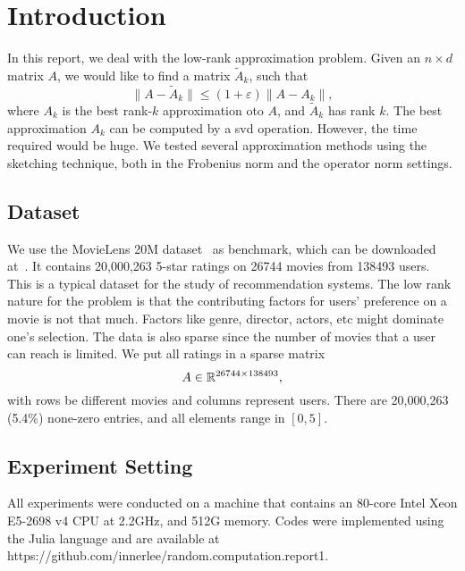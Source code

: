 \section{Introduction}
\label{sec:intro}

In this report, we deal with the low-rank approximation problem.
Given an $n\times d$ matrix $A$,
we would like to find a matrix $\tilde{A}_k$,
such that
\begin{equation}
    \| A - \tilde{A}_k \| \le (1+\varepsilon) \| A - A_k \|,
\end{equation}
where $A_k$ is the best rank-$k$ approximation oto $A$,
and $\tilde{A}_k$ has rank $k$.
The best approximation $A_k$ can be computed by a svd operation.
However, the time required would be huge.
We tested several approximation methods using the sketching technique,
both in the Frobenius norm and the operator norm settings.

\subsection{Dataset}

We use the MovieLens 20M dataset~\cite{lens} as benchmark,
which can be downloaded at~\cite{movielens}.
It contains 20,000,263 5-star ratings on 26744 movies from 138493 users.
This is a typical dataset for the study of recommendation systems.
The low rank nature for the problem is that the contributing factors
for users' preference on a movie is not that much.
Factors like genre, director, actors, etc might dominate one's selection.
The data is also sparse
since the number of movies that a user can reach is limited.
We put all ratings in a sparse matrix
\begin{equation}
    A \in {\mathbb{R}}^{26744\times 138493},
\end{equation}
with rows be different movies and columns represent users.
There are 20,000,263 (5.4\%) none-zero entries,
and all elements range in $[0, 5]$.

\subsection{Experiment Setting}

All experiments were conducted on a machine that contains an 80-core
Intel Xeon E5-2698 v4 CPU at 2.2GHz, and 512G memory.
Codes were implemented using the Julia language and are available at
https://github.com/innerlee/random.computation.report1.
